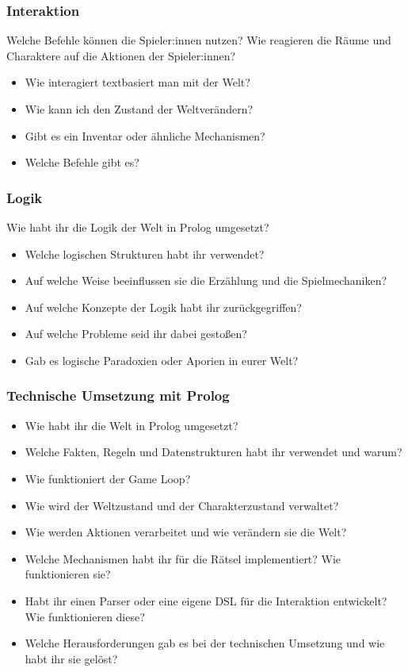 \documentclass[parskip=half,a4paper,11pt]{scrreprt}
\begin{document}
\subsubsection{Interaktion}

Welche Befehle können die Spieler:innen nutzen? Wie reagieren die Räume und Charaktere auf die Aktionen der Spieler:innen?

\begin{itemize}
    \item Wie interagiert textbasiert man mit der Welt? 
    \item Wie kann ich den Zustand der Weltverändern?
    \item Gibt es ein Inventar oder ähnliche Mechanismen?
    \item Welche Befehle gibt es?
\end{itemize}

\subsubsection{Logik}

Wie habt ihr die Logik der Welt in Prolog umgesetzt?

\begin{itemize}
\item Welche logischen Strukturen habt ihr verwendet?
\item Auf welche Weise beeinflussen sie die Erzählung und die Spielmechaniken?
\item Auf welche Konzepte der Logik habt ihr zurückgegriffen?
\item Auf welche Probleme seid ihr dabei gestoßen? 
\item Gab es logische Paradoxien oder Aporien in eurer Welt?
\end{itemize}

\subsubsection{Technische Umsetzung mit Prolog}
\begin{itemize}
\item Wie habt ihr die Welt in Prolog umgesetzt?
\item Welche Fakten, Regeln und Datenstrukturen habt ihr verwendet und warum?
\item Wie funktioniert der Game Loop?
\item Wie wird der Weltzustand und der Charakterzustand verwaltet?
\item Wie werden Aktionen verarbeitet und wie verändern sie die Welt?
\item Welche Mechanismen habt ihr für die Rätsel implementiert? Wie funktionieren sie?
\item Habt ihr einen Parser oder eine eigene DSL für die Interaktion entwickelt? Wie funktionieren diese?
\item Welche Herausforderungen gab es bei der technischen Umsetzung und wie habt ihr sie gelöst?
\end{itemize}
\end{document}
